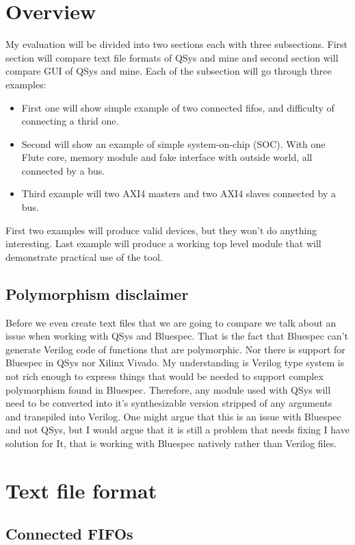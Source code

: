 \documentclass[14pt]{report}
\begin{document}
\section{Overview}
My evaluation will be divided into two sections each with three subsections. First section will compare text file formats of QSys and mine and second section will compare GUI of QSys and mine.
Each of the subsection will go through three examples:
\begin{itemize}
    \item First one will show simple example of two connected fifos, and difficulty of connecting a thrid one.
    \item Second will show an example of simple system-on-chip (SOC). With one Flute core, memory module and fake interface with outside world, all connected by a bus.
    \item Third example will two AXI4 masters and two AXI4 slaves connected by a bus. 
\end{itemize}
First two examples will produce valid devices, but they won't do anything interesting. Last example will produce a working top level module that will demonstrate practical use of the tool.

\subsection{Polymorphism disclaimer}
Before we even create text files that we are going to compare we talk about an issue when working with QSys and Bluespec. That is the fact that Bluespec can't generate Verilog code of functions that are polymorphic. Nor there is support for Bluespec in QSys nor Xilinx Vivado. My understanding is Verilog type system is not rich enough to express things that would be needed to support complex polymorphism found in Bluespec. Therefore, any module used with QSys will need to be converted into it's synthesizable version stripped of any arguments and transpiled into Verilog. One might argue that this is an issue with Bluespec and not QSys, but I would argue that it is still a problem that needs fixing I have solution for It, that is working with Bluespec natively rather than Verilog files. 


\section{Text file format}
\subsection{Connected FIFOs}
\end{document}
